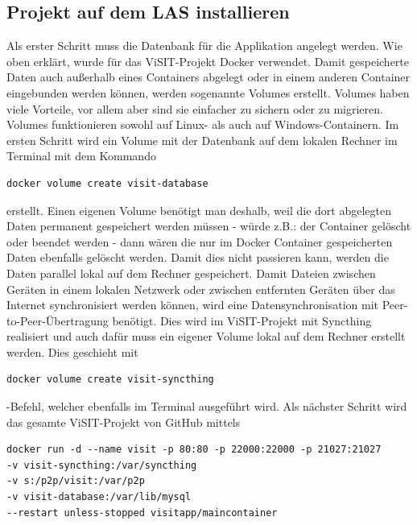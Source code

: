 \subsection{Projekt auf dem LAS installieren}

Als erster Schritt muss die Datenbank für die Applikation angelegt werden. Wie oben erklärt, wurde für das ViSIT-Projekt Docker verwendet. Damit gespeicherte Daten auch außerhalb eines Containers abgelegt oder in einem anderen Container eingebunden werden können, werden sogenannte Volumes erstellt. Volumes haben viele Vorteile, vor allem aber sind sie einfacher zu sichern oder zu migrieren. Volumes funktionieren sowohl auf Linux- als auch auf Windows-Containern.
Im ersten Schritt wird ein Volume mit der Datenbank auf dem lokalen Rechner im Terminal mit dem Kommando

\begin{lstlisting}[style=MyBashStyle,caption={Docker Volume erstellen}]
docker volume create visit-database
\end{lstlisting} erstellt. Einen eigenen Volume benötigt man deshalb, weil die dort abgelegten Daten permanent gespeichert werden müssen - würde z.B.: der Container gelöscht oder beendet werden - dann wären die nur im Docker Container gespeicherten Daten ebenfalls gelöscht werden. Damit dies nicht passieren kann, werden die Daten parallel lokal auf dem Rechner gespeichert.
Damit Dateien zwischen Geräten in einem lokalen Netzwerk oder zwischen entfernten Geräten über das Internet synchronisiert werden können, wird eine Datensynchronisation mit Peer-to-Peer-Übertragung benötigt. Dies wird im ViSIT-Projekt mit Syncthing realisiert und auch dafür muss ein eigener Volume lokal auf dem Rechner erstellt werden. Dies geschieht mit \begin{lstlisting}[style=MyBashStyle,caption={Docker Syncthing Volume erstellen}]
docker volume create visit-syncthing
\end{lstlisting}-Befehl, welcher ebenfalls im Terminal ausgeführt wird.
Als nächster Schritt wird das gesamte ViSIT-Projekt von GitHub mittels

\begin{lstlisting}[style=MyBashStyle,caption={Klonen des gesamten ViSIT-Projekts von GitHub}]
docker run -d --name visit -p 80:80 -p 22000:22000 -p 21027:21027
-v visit-syncthing:/var/syncthing
-v s:/p2p/visit:/var/p2p
-v visit-database:/var/lib/mysql
--restart unless-stopped visitapp/maincontainer \end{lstlisting}

